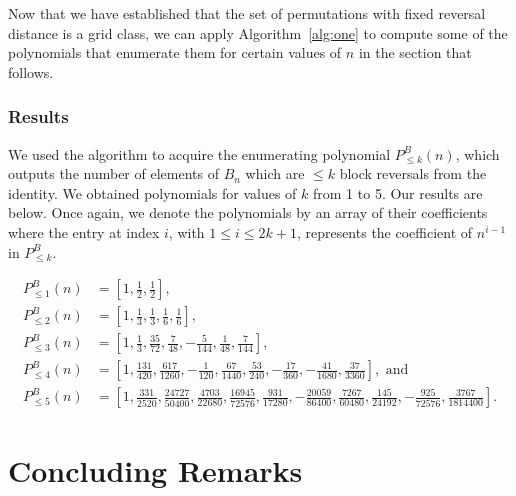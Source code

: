 \documentclass{article}
\numberwithin{equation}{section}
\theoremstyle{definition}
\begin{document}
Now that we have established that the set of permutations with fixed reversal distance is a grid class, we can apply Algorithm~\ref{alg:one} to compute some of the polynomials that enumerate them for certain values of $n$ in the section that follows.  

\subsubsection{Results}
We used the algorithm to acquire the enumerating polynomial $P^{B}_{\leq k}(n)$, which outputs the number of elements of $B_n$ which are $\leq k$ block reversals from the identity.  We obtained polynomials for values of $k$ from 1 to 5.  Our results are below. Once again, we denote the polynomials by an array of their coefficients where the entry at index $i$, with $1\leq i\leq 2k+1$, represents the coefficient of $n^{i-1}$ in $P^B_{\leq k}$.

\begin{align*}
P^{B}_{\leq 1}(n) &= \left[1,\frac{1}{2},\frac{1}{2}\right],\\
 P^{B}_{\leq 2}(n) &= \left[1,\frac{1}{3}, \frac{1}{3}, \frac{1}{6}, \frac{1}{6}\right],\\
 P^{B}_{\leq 3}(n) &= \left[1,\frac{1}{3},\frac{35}{72},\frac{7}{48},-\frac{5}{144},\frac{1}{48},\frac{7}{144}\right],\\
 P^{B}_{\leq 4}(n) &= \left[1,\frac{131}{420},\frac{617}{1260}, -\frac{1}{120},\frac{67}{1440}, \frac{53}{240}, -\frac{17}{360}, -\frac{41}{1680}, \frac{37}{3360}\right],\text{ and}\\
      P^{B}_{\leq 5}(n) &= \left[1,\frac{331}{2520}, \frac{24727}{50400}, \frac{4703}{22680}, \frac{16945}{72576}, \frac{931}{17280}, -\frac{20059}{86400}, \frac{7267}{60480},\frac{145}{24192},-\frac{925}{72576},\frac{3767}{1814400} \right].
\end{align*}

\section{Concluding Remarks}
\end{document}
